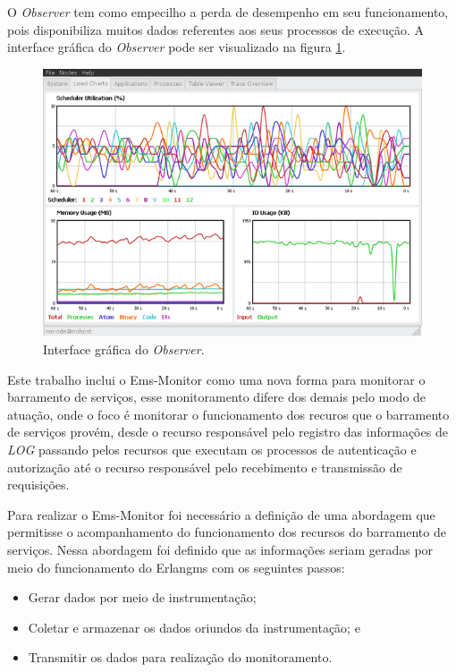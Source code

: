 O \textit{Observer} tem como empecilho a perda de desempenho em seu funcionamento, pois disponibiliza muitos dados referentes aos seus processos de execução. A interface gráfica do \textit{Observer} pode ser visualizado na figura \ref{fun:fig:observer}. 

\begin{figure}[H]
	\begin{center}
	\includegraphics[scale = 0.70]{img/observerGo.jpg}
		\caption{Interface gráfica do \textit{Observer}.}
		\label{fun:fig:observer}
	\end{center}
\end{figure}

Este trabalho inclui o Ems-Monitor como uma nova forma para monitorar o barramento de serviços, esse monitoramento difere dos demais pelo modo de atuação, onde o foco é monitorar o funcionamento dos recuros que o barramento de serviços provém, desde o recurso responsável pelo registro das informações de \textit{LOG} passando pelos recursos que executam os processos de autenticação e autorização até o recurso responsável pelo recebimento e transmissão de requisições. 

Para realizar o Ems-Monitor foi necessário a definição de uma abordagem que permitisse o acompanhamento do funcionamento dos recursos do barramento de serviços. Nessa abordagem foi definido que as informações seriam geradas por meio do funcionamento do Erlangms com os seguintes passos:

\begin{itemize}
    \item Gerar dados por meio de instrumentação;
    \item Coletar e armazenar os dados oriundos da instrumentação; e
    \item Transmitir os dados para realização do monitoramento. 
\end{itemize}

